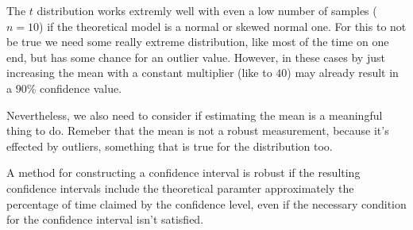 The $t$ distribution works extremly well with even a low number of samples ($n
=10$) if the theoretical model is a normal or skewed normal one. For this to not
be true we need some really extreme distribution, like most of the time on one
end, but has some chance for an outlier value. However, in these cases by just
increasing the mean with a constant multiplier (like to $40$) may already result
in a $90\%$ confidence value. 

Nevertheless, we also need to consider if estimating the mean is a meaningful
thing to do. Remeber that the mean is not a robust measurement, because it's
effected by outliers, something that is true for the distribution too.

A method for constructing a confidence interval is robust if the resulting
confidence intervals include the theoretical paramter approximately the
percentage of time claimed by the confidence level, even if the necessary
condition for the confidence interval isn't satisfied.
